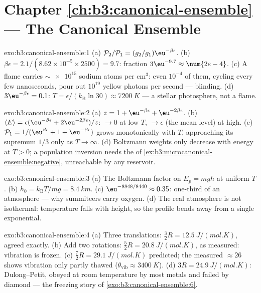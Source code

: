 \section*{Chapter \ref{ch:b3:canonical-ensemble} --- The Canonical Ensemble}

\begin{solution}{exo:b3:canonical-ensemble:1}
(a) $\mathcal P_2/\mathcal P_1 = (g_2/g_1)\eu^{-\beta\epsilon}$.
(b) $\beta\epsilon = 2.1/(8.62\times10^{-5} \times 2500) = 9.7$:
fraction $3\eu^{-9.7} \approx \num{2e-4}$. (c) A flame carries
$\sim\num{e15}$ sodium atoms per cm$^3$: even $10^{-4}$ of them,
cycling every few nanoseconds, pour out $10^{19}$ yellow photons
per second --- blinding. (d) $3\eu^{-\beta\epsilon} = 0.1$:
$T = \epsilon/(k_{\text{B}}\ln30) \approx \qty{7200}{K}$ --- a
stellar photosphere, not a flame.
\end{solution}

\begin{solution}{exo:b3:canonical-ensemble:2}
(a) $z = 1 + \eu^{-\beta\epsilon} + \eu^{-2\beta\epsilon}$. (b)
$\langle E\rangle = \epsilon(\eu^{-\beta\epsilon} +
2\eu^{-2\beta\epsilon})/z$: $\to 0$ at low $T$, $\to \epsilon$
(the mean level) at high. (c) $\mathcal P_1 = 1/(\eu^{\beta
\epsilon} + 1 + \eu^{-\beta\epsilon})$ grows monotonically with
$T$, approaching its supremum $1/3$ only as $T \to \infty$. (d)
Boltzmann weights only decrease with energy at $T > 0$; a
population inversion needs the  of
\cref{ex:b3:microcanonical-ensemble:negative}, unreachable by any
reservoir.
\end{solution}

\begin{solution}{exo:b3:canonical-ensemble:3}
(a) The Boltzmann factor on $E_p = mgh$ at uniform $T$. (b) $h_0 =
k_{\text{B}}T/mg = \qty{8.4}{km}$. (c) $\eu^{-8848/8440} \approx
0.35$: one-third of an atmosphere --- why summiteers carry oxygen.
(d) The real atmosphere is not isothermal: temperature falls with
height, so the profile bends away from a single exponential.
\end{solution}

\begin{solution}{exo:b3:canonical-ensemble:4}
(a) Three translations: $\tfrac32 R = \qty{12.5}{J/(mol.K)}$,
agreed exactly. (b) Add two rotations: $\tfrac52 R =
\qty{20.8}{J/(mol.K)}$, as measured: vibration is frozen. (c)
$\tfrac72 R = \qty{29.1}{J/(mol.K)}$ predicted; the measured
$\approx26$ shows vibration only partly thawed ($\theta_{\text{vib}}
\approx \qty{3400}{K}$). (d) $3R = \qty{24.9}{J/(mol.K)}$:
Dulong--Petit, obeyed at room temperature by most metals and
failed by diamond --- the freezing story of
\cref{exo:b3:canonical-ensemble:6}.
\end{solution}

